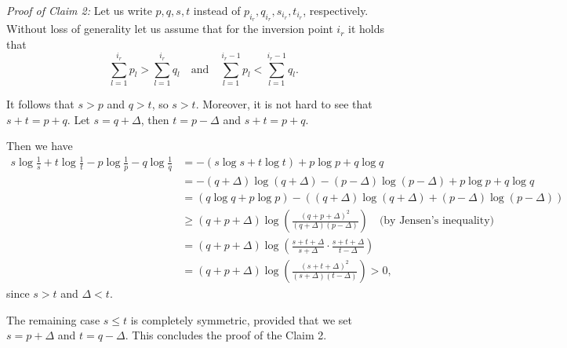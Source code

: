     \emph{Proof of Claim 2:} Let us write $p, q, s, t$ instead of $p_{i_r}, q_{i_r}, s_{i_r}, t_{i_r}$, respectively. Without loss of generality let us assume that for the inversion point $i_r$ it holds that
    \[
    \sum_{l=1}^{i_r} p_l > \sum_{l=1}^{i_r} q_l \quad \text{and} \quad \sum_{l=1}^{i_r-1} p_l < \sum_{l=1}^{i_r-1} q_l.
    \]
    
    It follows that $s > p$ and $q > t$, so $s > t$. Moreover, it is not hard to see that $s + t = p + q$. Let $s = q + \Delta$, then $t = p - \Delta$ and $s + t = p + q$.
    
    Then we have
    \begin{align*}
    s \log \frac{1}{s} + t \log \frac{1}{t} - p \log \frac{1}{p} - q \log \frac{1}{q}
    &= - (s \log s + t \log t) + p \log p + q \log q \\
    &= - (q + \Delta) \log (q + \Delta) - (p - \Delta) \log (p - \Delta) + p \log p + q \log q \\
    &= (q \log q + p \log p) - \left( (q + \Delta) \log (q + \Delta) + (p - \Delta) \log (p - \Delta) \right) \\
    &\geq (q + p + \Delta) \log \left( \frac{(q + p + \Delta)^2}{(q + \Delta)(p - \Delta)} \right) \quad \text{(by Jensen's inequality)} \\
    &= (q + p + \Delta) \log \left( \frac{s + t + \Delta}{s + \Delta} \cdot \frac{s + t + \Delta}{t - \Delta} \right) \\
    &= (q + p + \Delta) \log \left( \frac{(s + t + \Delta)^2}{(s + \Delta)(t - \Delta)} \right) > 0,
    \end{align*}
    since $s > t$ and $\Delta < t$.

    The remaining case $s \leq t$ is completely symmetric, provided that we set $s = p + \Delta$ and $t = q - \Delta$. This concludes the proof of the Claim 2.

